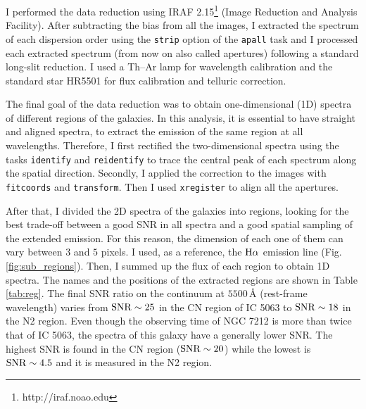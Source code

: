 \documentclass[../main.tex]{subfiles}
\begin{document}
I performed the data reduction using IRAF 2.15\footnote{http://iraf.noao.edu} (Image Reduction and Analysis Facility).
After subtracting the bias from all the images, I extracted the spectrum of each dispersion order using the \verb!strip! option of the \verb!apall! task and I processed each extracted spectrum (from now on also called apertures) following a standard long-slit reduction.
I used a Th--Ar lamp for wavelength calibration and the standard star HR5501 for flux calibration and telluric correction.

The final goal of the data reduction was to obtain one-dimensional (1D) spectra of different regions of the galaxies.
In this analysis, it is essential to have straight and aligned spectra, to extract the emission of the same region at all wavelengths. 
Therefore, I first rectified the two-dimensional spectra using the tasks \verb!identify! and \verb!reidentify! to trace the central peak of each spectrum along the spatial direction.
Secondly, I applied the correction to the images with \verb!fitcoords! and \verb!transform!. 
Then I used \verb!xregister! to align all the apertures.

After that, I divided the 2D spectra of the galaxies into regions, looking for the best trade-off between a good SNR in all spectra and a good spatial sampling of the extended emission.
For this reason, the dimension of each one of them can vary between $3$ and $5$ pixels.
I used, as a reference, the $\rm H\alpha$ emission line (Fig.\,\ref{fig:sub_regions}).
Then, I summed up the flux of each region to obtain 1D spectra.
The names and the positions of the extracted regions are shown in Table\,\ref{tab:reg}.
The final SNR ratio on the continuum at $5500\,\si{\angstrom}$ (rest-frame wavelength) varies from $\rm SNR \sim 25$ in the CN region of IC 5063 to $\rm SNR \sim 18$ in the N2 region.
Even though the observing time of NGC 7212 is more than twice that of IC 5063, the spectra of this galaxy have a generally lower SNR.
The highest SNR is found in the CN region ($\rm SNR \sim 20$) while the lowest is $\rm SNR \sim 4.5$ and it is measured in the N2 region.
\end{document}
